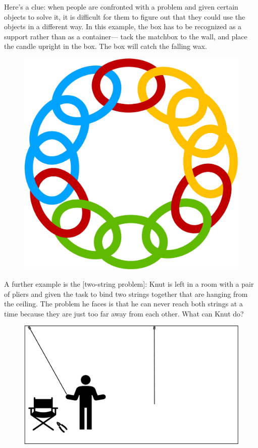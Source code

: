 \documentclass[
]{krantz}
\begin{document}
Here's a clue: when people are confronted with a problem and given certain objects to solve it, it is difficult for them to figure out that they could use the objects in a different way. In this example, the box has to be recognized as a support rather than as a container--- tack the matchbox to the wall, and place the candle upright in the box. The box will catch the falling wax.

\begin{figure}

{\centering \includegraphics[width=0.6\linewidth]{images/ch10/fig3} 

}

\end{figure}

A further example is the {[}two-string problem{]}: Knut is left in a room with a pair of pliers and given the task to bind two strings together that are hanging from the ceiling. The problem he faces is that he can never reach both strings at a time because they are just too far away from each other. What can Knut do?

\begin{figure}

{\centering \includegraphics[width=0.6\linewidth]{images/ch10/fig4} 

}

\end{figure}
\end{document}
